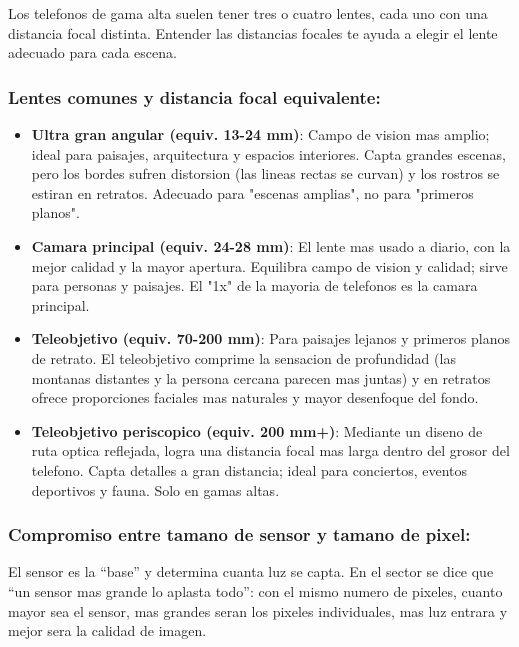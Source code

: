 
Los telefonos de gama alta suelen tener tres o cuatro lentes, cada uno con una distancia focal distinta. Entender las distancias focales te ayuda a elegir el lente adecuado para cada escena.

\subsubsection*{Lentes comunes y distancia focal equivalente:}

\begin{itemize}
  \item \textbf{Ultra gran angular (equiv. 13-24 mm)}: Campo de vision mas amplio; ideal para paisajes, arquitectura y espacios interiores. Capta grandes escenas, pero los bordes sufren distorsion (las lineas rectas se curvan) y los rostros se estiran en retratos. Adecuado para "escenas amplias", no para "primeros planos".
  \item \textbf{Camara principal (equiv. 24-28 mm)}: El lente mas usado a diario, con la mejor calidad y la mayor apertura. Equilibra campo de vision y calidad; sirve para personas y paisajes. El "1x" de la mayoria de telefonos es la camara principal.
  \item \textbf{Teleobjetivo (equiv. 70-200 mm)}: Para paisajes lejanos y primeros planos de retrato. El teleobjetivo comprime la sensacion de profundidad (las montanas distantes y la persona cercana parecen mas juntas) y en retratos ofrece proporciones faciales mas naturales y mayor desenfoque del fondo.
  \item \textbf{Teleobjetivo periscopico (equiv. 200 mm+)}: Mediante un diseno de ruta optica reflejada, logra una distancia focal mas larga dentro del grosor del telefono. Capta detalles a gran distancia; ideal para conciertos, eventos deportivos y fauna. Solo en gamas altas.
\end{itemize}

\subsubsection*{Compromiso entre tamano de sensor y tamano de pixel:}

El sensor es la “base” y determina cuanta luz se capta. En el sector se dice que “un sensor mas grande lo aplasta todo”: con el mismo numero de pixeles, cuanto mayor sea el sensor, mas grandes seran los pixeles individuales, mas luz entrara y mejor sera la calidad de imagen.

